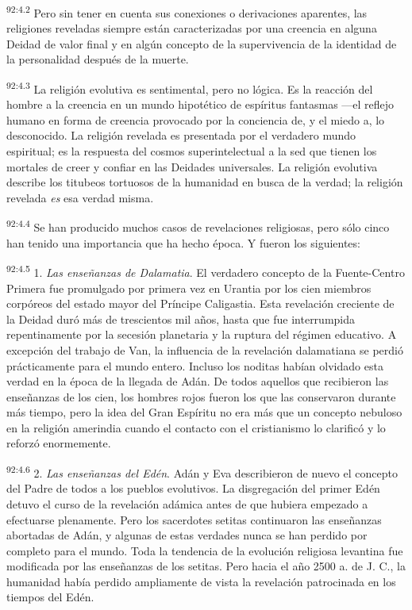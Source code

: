 \documentclass[twoside, 11pt]{book}
\begin{document}
\par
\textsuperscript{92:4.2} Pero sin tener en cuenta sus conexiones o derivaciones aparentes, las religiones reveladas siempre están caracterizadas por una creencia en alguna Deidad de valor final y en algún concepto de la supervivencia de la identidad de la personalidad después de la muerte.

\par
\textsuperscript{92:4.3} La religión evolutiva es sentimental, pero no lógica. Es la reacción del hombre a la creencia en un mundo hipotético de espíritus fantasmas ---el reflejo humano en forma de creencia provocado por la conciencia de, y el miedo a, lo desconocido. La religión revelada es presentada por el verdadero mundo espiritual; es la respuesta del cosmos superintelectual a la sed que tienen los mortales de creer y confiar en las Deidades universales. La religión evolutiva describe los titubeos tortuosos de la humanidad en busca de la verdad; la religión revelada \textit{es} esa verdad misma.

\par
\textsuperscript{92:4.4} Se han producido muchos casos de revelaciones religiosas, pero sólo cinco han tenido una importancia que ha hecho época. Y fueron los siguientes:

\par
\textsuperscript{92:4.5} 1. \textit{Las enseñanzas de Dalamatia}. El verdadero concepto de la Fuente-Centro Primera fue promulgado por primera vez en Urantia por los cien miembros corpóreos del estado mayor del Príncipe Caligastia. Esta revelación creciente de la Deidad duró más de trescientos mil años, hasta que fue interrumpida repentinamente por la secesión planetaria y la ruptura del régimen educativo. A excepción del trabajo de Van, la influencia de la revelación dalamatiana se perdió prácticamente para el mundo entero. Incluso los noditas habían olvidado esta verdad en la época de la llegada de Adán. De todos aquellos que recibieron las enseñanzas de los cien, los hombres rojos fueron los que las conservaron durante más tiempo, pero la idea del Gran Espíritu no era más que un concepto nebuloso en la religión amerindia cuando el contacto con el cristianismo lo clarificó y lo reforzó enormemente.

\par
\textsuperscript{92:4.6} 2. \textit{Las enseñanzas del Edén}. Adán y Eva describieron de nuevo el concepto del Padre de todos a los pueblos evolutivos. La disgregación del primer Edén detuvo el curso de la revelación adámica antes de que hubiera empezado a efectuarse plenamente. Pero los sacerdotes setitas continuaron las enseñanzas abortadas de Adán, y algunas de estas verdades nunca se han perdido por completo para el mundo. Toda la tendencia de la evolución religiosa levantina fue modificada por las enseñanzas de los setitas. Pero hacia el año 2500 a. de J. C., la humanidad había perdido ampliamente de vista la revelación patrocinada en los tiempos del Edén.
\end{document}
